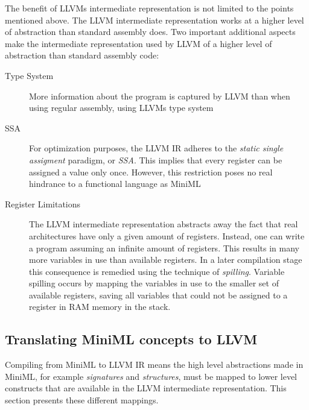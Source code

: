 \documentclass[10pt,a4paper]{report}
\begin{document}
The benefit of LLVMs intermediate representation is not limited to the points mentioned above. The LLVM intermediate representation works at a higher level of abstraction than standard assembly does. Two important additional aspects make the intermediate representation used by LLVM of a higher level of abstraction than standard assembly code:

\begin{description}
\item[Type System] More information about the program is captured by LLVM than when using regular assembly, using LLVMs type system
\item[SSA] For optimization purposes, the LLVM IR adheres to the \emph{static single assigment} paradigm, or \emph{SSA}. This implies that every register can be assigned a value only once. However, this restriction poses no real hindrance to a functional language as \mbox{MiniML}
\item[Register Limitations]  The LLVM intermediate representation abstracts away the fact that real architectures have only a given amount of registers. Instead, one can write a program assuming an infinite amount of registers. This results in many more variables in use than available registers.
In a later compilation stage this consequence is remedied using the technique of \emph{spilling}. Variable spilling occurs by mapping the variables in use to the smaller set of available registers, saving all variables that could not be assigned to a register in RAM memory in the stack.
\end{description}

\subsection{Translating MiniML concepts to LLVM}
Compiling from \mbox{MiniML} to LLVM IR means the high level abstractions made in \mbox{MiniML}, for example \emph{signatures} and \emph{structures}, must be mapped to lower level constructs that are available in the LLVM intermediate representation. This section presents these different mappings.
\end{document}
